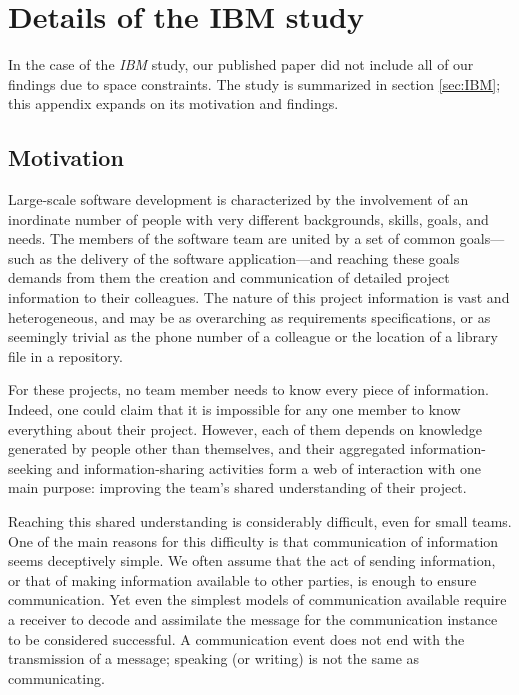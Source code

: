 \chapter{Details of the IBM study}
\label{app:IBM}

In the case of the \emph{IBM} study, our published paper \cite{Aranda2007b} did not include all of our findings due to space constraints. The study is summarized in section \ref{sec:IBM}; this appendix expands on its motivation and findings.


\section{Motivation}

Large-scale software development is characterized by the involvement of an inordinate number of people with very different backgrounds, skills, goals, and needs. The members of the software team are united by a set of common goals---such as the delivery of the software application---and reaching these goals demands from them the creation and communication of detailed project information to their colleagues. The nature of this project information is vast and heterogeneous, and may be as overarching as requirements specifications, or as seemingly trivial as the phone number of a colleague or the location of a library file in a repository.

For these projects, no team member needs to know every piece of information. Indeed, one could claim that it is impossible for any one member to know everything about their project. However, each of them depends on knowledge generated by people other than themselves, and their aggregated information-seeking and information-sharing activities form a web of interaction with one main purpose: improving the team's shared understanding of their project.

Reaching this shared understanding is considerably difficult, even for small teams. One of the main reasons for this difficulty is that communication of information seems deceptively simple. We often assume that the act of sending information, or that of making information available to other parties, is enough to ensure communication. Yet even the simplest models of communication available require a receiver to decode and assimilate the message for the communication instance to be considered successful. A communication event does not end with the transmission of a message; speaking (or writing) is not the same as communicating.


